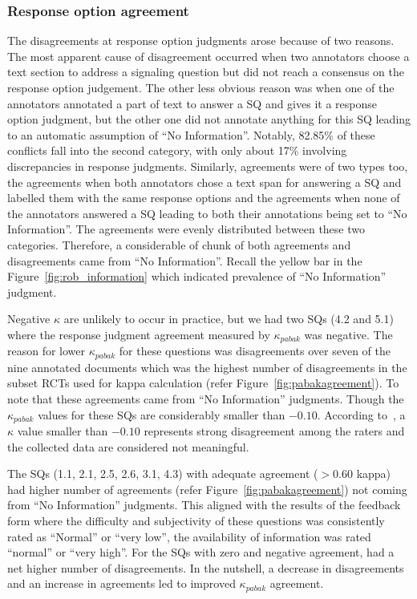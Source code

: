 \documentclass[sn-mathphys,Numbered]{sn-jnl}%
\theoremstyle{thmstyleone}%
\theoremstyle{thmstyletwo}%
\theoremstyle{thmstylethree}%
\begin{document}
\subsubsection{Response option agreement}
\label{disc:kappa}
%
The disagreements at response option judgments arose because of two reasons.
The most apparent cause of disagreement occurred when two annotators choose a text section to address a signaling question but did not reach a consensus on the response option judgement.
The other less obvious reason was when one of the annotators annotated a part of text to answer a SQ and gives it a response option judgment, but the other one did not annotate anything for this SQ leading to an automatic assumption of ``No Information''.
Notably, 82.85\% of these conflicts fall into the second category, with only about 17\% involving discrepancies in response judgments.
Similarly, agreements were of two types too, the agreements when both annotators chose a text span for answering a SQ and labelled them with the same response options and the agreements when none of the annotators answered a SQ leading to both their annotations being set to ``No Information''.
The agreements were evenly distributed between these two categories.
Therefore, a considerable of chunk of both agreements and disagreements came from ``No Information''.
Recall the yellow bar in the Figure~\ref{fig:rob_information} which indicated prevalence of ``No Information'' judgment.


Negative $\kappa$ are unlikely to occur in practice, but we had two SQs (4.2 and 5.1) where the response judgment agreement measured by $\kappa_{pabak}$ was negative.
The reason for lower $\kappa_{pabak}$ for these questions was disagreements over seven of the nine annotated documents which was the highest number of disagreements in the subset RCTs used for kappa calculation (refer Figure~\ref{fig:pabakagreement}).
To note that these agreements came from ``No Information'' judgments.
Though the $\kappa_{pabak}$ values for these SQs are considerably smaller than $-0.10$.
According to~\cite{mchugh2012interrater}, a $\kappa$ value smaller than $-0.10$ represents strong disagreement among the raters and the collected data are considered not meaningful.


The SQs (1.1, 2.1, 2.5, 2.6, 3.1, 4.3) with adequate agreement ($>0.60$ kappa) had higher number of agreements (refer Figure~\ref{fig:pabakagreement}) not coming from ``No Information'' judgments.
This aligned with the results of the feedback form where the difficulty and subjectivity of these questions was consistently rated as ``Normal'' or ``very low'', the availability of information was rated ``normal'' or ``very high''.
For the SQs with zero and negative agreement, had a net higher number of disagreements.
In the nutshell, a decrease in disagreements and an increase in agreements led to improved $\kappa_{pabak}$ agreement.
\end{document}
